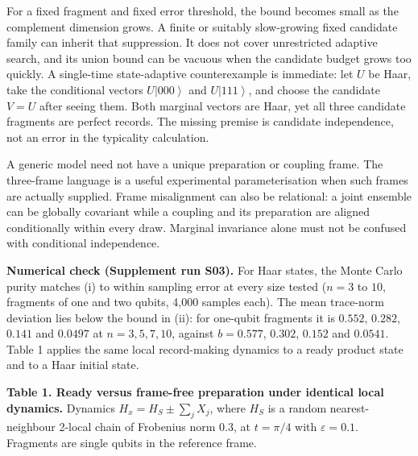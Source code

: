 \documentclass[
  10pt,
  a4paper,
]{article}
\begin{document}
For a fixed fragment and fixed error threshold, the bound becomes small
as the complement dimension grows. A finite or suitably slow-growing
fixed candidate family can inherit that suppression. It does not cover
unrestricted adaptive search, and its union bound can be vacuous when
the candidate budget grows too quickly. A single-time state-adaptive
counterexample is immediate: let \(U\) be Haar, take the conditional
vectors \(U\left| 000\right\rangle\) and \(U\left| 111\right\rangle\),
and choose the candidate \(V=U\) after seeing them. Both marginal
vectors are Haar, yet all three candidate fragments are perfect records.
The missing premise is candidate independence, not an error in the
typicality calculation.

A generic model need not have a unique preparation or coupling frame.
The three-frame language is a useful experimental parameterisation when
such frames are actually supplied. Frame misalignment can also be
relational: a joint ensemble can be globally covariant while a coupling
and its preparation are aligned conditionally within every draw.
Marginal invariance alone must not be confused with conditional
independence.

\textbf{Numerical check (Supplement run S03).} For Haar states, the
Monte Carlo purity matches (i) to within sampling error at every size
tested (\(n=3\) to \(10\), fragments of one and two qubits, 4,000
samples each). The mean trace-norm deviation lies below the bound in
(ii): for one-qubit fragments it is \(0.552\), \(0.282\), \(0.141\) and
\(0.0497\) at \(n=3,5,7,10\), against \(b=0.577\), \(0.302\), \(0.152\)
and \(0.0541\). Table 1 applies the same local record-making dynamics to
a ready product state and to a Haar initial state.


\textbf{Table 1. Ready versus frame-free preparation under identical
local dynamics.} Dynamics \(H_x=H_S\pm\sum_jX_j\), where \(H_S\) is a
random nearest-neighbour 2-local chain of Frobenius norm \(0.3\), at
\(t=\pi/4\) with \(\varepsilon=0.1\). Fragments are single qubits in the
reference frame.
\end{document}
